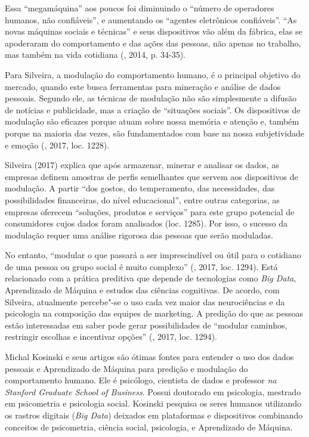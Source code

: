 Essa ``megamáquina'' aos poucos foi diminuindo o ``número de operadores
humanos, não confiáveis'', e aumentando os ``agentes eletrônicos
confiáveis''. ``As novas máquinas sociais e técnicas'' e seus
dispositivos vão além da fábrica, elas se apoderaram do comportamento e
das ações das pessoas, não apenas no trabalho, mas também na vida
cotidiana (, 2014, p. 34-35).

Para Silveira, a modulação do comportamento humano, é o principal
objetivo do mercado, quando este busca ferramentas para mineração e
análise de dados pessoais. Segundo ele, as técnicas de modulação não são
simplesmente a difusão de notícias e publicidade, mas a criação de
``situações sociais''. Os dispositivos de modulação são eficazes porque
atuam sobre nossa memória e atenção e, também porque na maioria das
vezes, são fundamentados com base na nossa subjetividade e emoção
(, 2017, loc. 1228).

Silveira (2017) explica que após armazenar, minerar e analisar os dados,
as empresas definem amostras de perfis semelhantes que servem aos
dispositivos de modulação. A partir ``dos gostos, do temperamento, das
necessidades, das possibilidades financeiras, do nível educacional'',
entre outras categorias, as empresas oferecem ``soluções, produtos e
serviços'' para este grupo potencial de consumidores cujos dados foram
analisados (loc. 1285). Por isso, o sucesso da modulação requer uma
análise rigorosa das pessoas que serão moduladas.

No entanto, ``modular o que passará a ser imprescindível ou útil para o
cotidiano de uma pessoa ou grupo social é muito complexo'' (,
2017, loc. 1294). Está relacionado com a prática preditiva que depende
de tecnologias como \emph{Big Data}, Aprendizado de Máquina e estudos
das ciências cognitivas. De acordo, com Silveira, atualmente percebe"-se
o uso cada vez maior das neurociências e da psicologia na composição das
equipes de marketing. A predição do que as pessoas estão interessadas em
saber pode gerar possibilidades de ``modular caminhos, restringir
escolhas e incentivar opções'' (, 2017, loc. 1294).

Michal Kosinski e seus artigos são ótimas fontes para entender o uso dos
dados pessoais e Aprendizado de Máquina para predição e modulação do
comportamento humano. Ele é psicólogo, cientista de dados e professor
\emph{na Stanford Graduate School of Business}. Possui doutorado em
psicologia, mestrado em psicometria e psicologia social. Kosinski
pesquisa os seres humanos utilizando os rastros digitais (\emph{Big
Data}) deixados em plataformas e dispositivos combinando conceitos de
psicometria, ciência social, psicologia, e Aprendizado de Máquina.

